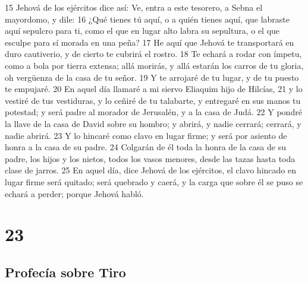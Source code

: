 15 Jehová de los ejércitos dice así: Ve, entra a este tesorero, a Sebna el mayordomo, y dile:
16 ¿Qué tienes tú aquí, o a quién tienes aquí, que labraste aquí sepulcro para ti, como el que en lugar alto labra su sepultura, o el que esculpe para sí morada en una peña?
17 He aquí que Jehová te transportará en duro cautiverio, y de cierto te cubrirá el rostro.
18 Te echará a rodar con ímpetu, como a bola por tierra extensa; allá morirás, y allá estarán los carros de tu gloria, oh vergüenza de la casa de tu señor.
19 Y te arrojaré de tu lugar, y de tu puesto te empujaré.
20 En aquel día llamaré a mi siervo Eliaquim hijo de Hilcías,
21 y lo vestiré de tus vestiduras, y lo ceñiré de tu talabarte, y entregaré en sus manos tu potestad; y será padre al morador de Jerusalén, y a la casa de Judá.
22 Y pondré la llave de la casa de David sobre su hombro; y abrirá, y nadie cerrará; cerrará, y nadie abrirá. 
23 Y lo hincaré como clavo en lugar firme; y será por asiento de honra a la casa de su padre.
24 Colgarán de él toda la honra de la casa de su padre, los hijos y los nietos, todos los vasos menores, desde las tazas hasta toda clase de jarros.
25 En aquel día, dice Jehová de los ejércitos, el clavo hincado en lugar firme será quitado; será quebrado y caerá, y la carga que sobre él se puso se echará a perder; porque Jehová habló. 

\chapter{23}

\section*{Profecía sobre Tiro}

